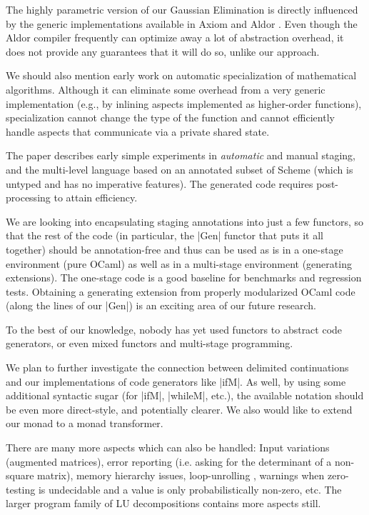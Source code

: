 \documentclass[draft]{elsart}
\begin{document}
The highly parametric version of our Gaussian Elimination is directly
influenced by the generic implementations available in Axiom
\cite{Axiom} and Aldor \cite{Watt:2002:HCA}.  Even though the Aldor
compiler frequently can optimize away a lot of abstraction overhead, 
it does not provide any guarantees that it will do so, unlike our
approach.

We should also mention early work \cite{Gluck95} on automatic
specialization of mathematical algorithms. Although it can eliminate
some overhead from a very generic implementation (e.g., by inlining
aspects implemented as higher-order functions), specialization cannot
change the type of the function and cannot efficiently handle aspects
that communicate via a private shared state.

The paper \cite{GluckJ97} describes early simple experiments in
\emph{automatic} and manual staging, and the multi-level language
based on an annotated subset of Scheme (which is untyped and has no
imperative features). The generated code requires post-processing to
attain efficiency.  

We are looking into encapsulating staging
annotations into just a few functors, so that the rest of the code (in
particular, the |Gen| functor that puts it all together) should be
annotation-free and thus can be used as is in a one-stage environment
(pure OCaml) as well as in a multi-stage environment (generating
extensions). The one-stage code is a good baseline for benchmarks and
regression tests. Obtaining a generating extension from properly
modularized OCaml code (along the lines of our |Gen|) is an exciting
area of our future research.

To the best of our knowledge, nobody has yet used functors to
abstract code generators, or even mixed functors and 
multi-stage programming.

We plan to further investigate the connection between delimited
continuations and our implementations of code generators like
|ifM|.  As well, by using some additional syntactic sugar
(for |ifM|, |whileM|, etc.), the available notation should be
even more direct-style, and potentially clearer.
We also would like to extend our monad to a monad transformer.

There are many more aspects which can also be handled:
Input variations (augmented
matrices), error reporting (i.e. asking for the determinant of a 
non-square matrix), memory hierarchy issues, loop-unrolling
\cite{Padua:MetaOcaml:04},
warnings when zero-testing is undecidable and
a value is only probabilistically non-zero, etc.  The larger program
family of LU decompositions contains more aspects still.
\end{document}
